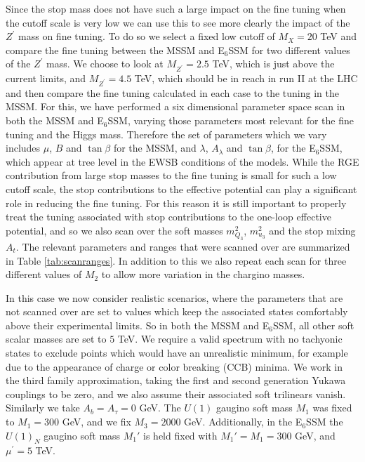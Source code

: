 \documentclass[preprint,amsmath,amssymb,aps,superscriptaddress,prd,
showpacs,floatfix,nofootinbib]{revtex4-1}
\begin{document}
Since the stop mass does not have such a large impact on the fine
tuning when the cutoff scale is very low we can use this to see more
clearly the impact of the $Z^\prime$ mass on fine tuning.  To do so we
select a fixed low cutoff of $M_X=20$ TeV and compare the fine tuning
between the MSSM and E$_6$SSM for two different values of the
$Z^\prime$ mass.  We choose to look at $M_{Z^\prime} = 2.5$ TeV, which is
just above the current limits, and $M_{Z^\prime} = 4.5$ TeV, which
should be in reach in run II at the LHC \cite{Godfrey:2013eta} and
then compare the fine tuning calculated in each case to the tuning in
the MSSM.  For this, we have performed a six dimensional parameter
space scan in both the MSSM and E$_6$SSM, varying those parameters
most relevant for the fine tuning and the Higgs mass.  Therefore the
set of parameters which we vary includes $\mu$, $B$ and $\tan\beta$
for the MSSM, and $\lambda$, $A_\lambda$ and $\tan\beta$, for the
E$_6$SSM, which appear at tree level in the EWSB conditions of the
models.  While the RGE contribution from large stop masses to the fine
tuning is small for such a low cutoff scale, the stop contributions to
the effective potential can play a significant role in reducing the
fine tuning.  For this reason it is still important to properly treat
the tuning associated with stop contributions to the one-loop
effective potential, and so we also scan over the soft masses
$m_{Q_3}^2$, $m_{u_3}^2$ and the stop mixing $A_t$.  The relevant
parameters and ranges that were scanned over are summarized in Table
\ref{tab:scanranges}.  In addition to this we also repeat each scan
for three different values of $M_2$ to allow more variation in the
chargino masses.

In this case we now consider realistic scenarios, where the
parameters that are not scanned over are set to values which keep the
associated states comfortably above their experimental limits.  So in
both the MSSM and E$_6$SSM, all other soft scalar masses are set
to $5$ TeV.  We require a valid spectrum with no
tachyonic states to exclude points which would have an unrealistic minimum,
for example due to the appearance of charge or color breaking (CCB) minima.
We work in the third family approximation, taking the first and second
generation Yukawa couplings to be zero, and we also assume their associated
soft trilinears vanish.  Similarly we take $A_b = A_\tau = 0$ GeV.  The $U(1)$
gaugino soft mass $M_1$ was fixed to $M_1 = 300$ GeV, and we fix $M_3 = 2000$
GeV.  Additionally, in the E$_6$SSM the $U(1)_N$ gaugino soft mass $M_1'$ is
held fixed with $M_1' = M_1 = 300$ GeV, and $\mu^\prime = 5$ TeV.
\end{document}
